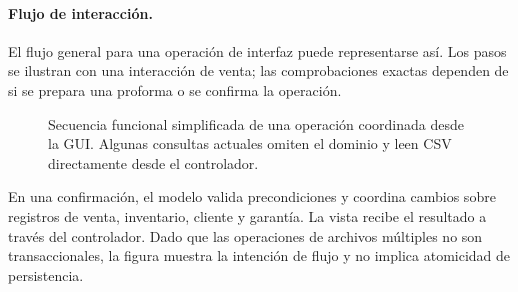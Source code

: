 \paragraph{Flujo de interacción.}

El flujo general para una operación de interfaz puede representarse así. Los pasos se ilustran con una interacción de venta; las comprobaciones exactas dependen de si se prepara una proforma o se confirma la operación.

\begin{figure}[H]
\centering
{}
\caption{Secuencia funcional simplificada de una operación coordinada desde la GUI. Algunas consultas actuales omiten el dominio y leen CSV directamente desde el controlador.}
\label{fig:secuencia-mvc}
\end{figure}

En una confirmación, el modelo valida precondiciones y coordina cambios sobre registros de venta, inventario, cliente y garantía. La vista recibe el resultado a través del controlador. Dado que las operaciones de archivos múltiples no son transaccionales, la figura muestra la intención de flujo y no implica atomicidad de persistencia.
